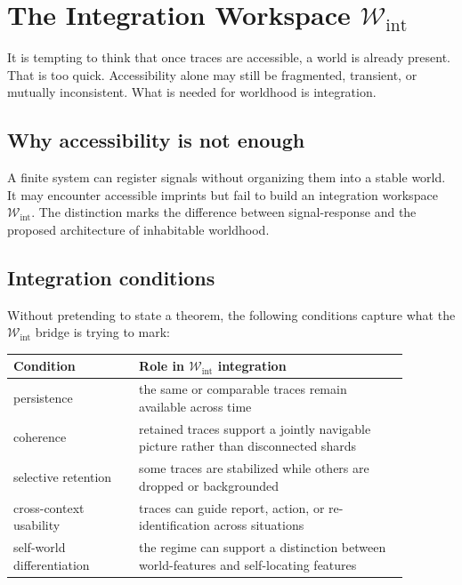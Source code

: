 \documentclass[12pt,a4paper]{article}
\begin{document}
\section{The Integration Workspace \texorpdfstring{\(\mathcal W_{\mathrm{int}}\)}{W-int}}

It is tempting to think that once traces are accessible, a world is already present. That is too quick. Accessibility alone may still be fragmented, transient, or mutually inconsistent. What is needed for worldhood is integration.

\subsection{Why accessibility is not enough}

A finite system can register signals without organizing them into a
stable world. It may encounter accessible imprints but fail to build an
integration workspace \(\mathcal W_{\mathrm{int}}\). The distinction
marks the difference between signal-response and the proposed
architecture of inhabitable worldhood.

\subsection{Integration conditions}

Without pretending to state a theorem, the following conditions capture
what the \(\mathcal W_{\mathrm{int}}\) bridge is trying to mark:

\begin{center}
\begin{tabular}{P{0.28\linewidth}P{0.6\linewidth}}
\toprule
\textbf{Condition} & \textbf{Role in \(\mathcal W_{\mathrm{int}}\) integration} \\
\midrule
persistence & the same or comparable traces remain available across time \\
coherence & retained traces support a jointly navigable picture rather than disconnected shards \\
selective retention & some traces are stabilized while others are dropped or backgrounded \\
cross-context usability & traces can guide report, action, or re-identification across situations \\
self-world differentiation & the regime can support a distinction between world-features and self-locating features \\
\bottomrule
\end{tabular}
\end{center}
\end{document}
